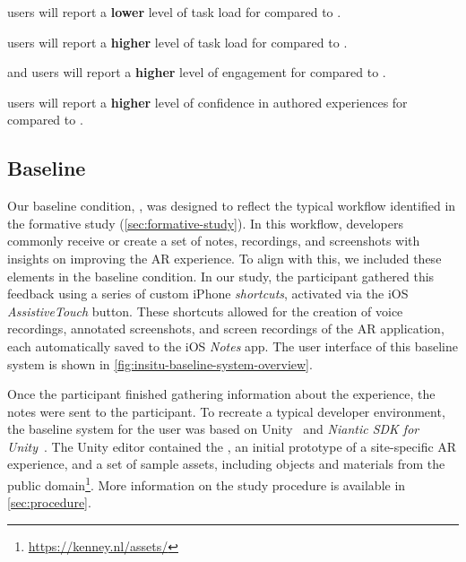 \begin{hypothesis}\label{h1}
\Exsitu users will report a \textbf{lower} level of task load for \sync{} compared to \async{}.
\end{hypothesis}

\begin{hypothesis}\label{h2}
\Insitu users will report a \textbf{higher} level of task load for \sync{} compared to \async{}.
\end{hypothesis}

\begin{hypothesis}\label{h3}
\Exsitu and \insitu users will report a \textbf{higher} level of engagement for \sync{} compared to \async{}.
\end{hypothesis}

\begin{hypothesis}\label{h4}
\Exsitu users will report a \textbf{higher} level of confidence in authored experiences for \sync{} compared to \async{}.
\end{hypothesis}

\subsection{Baseline}
Our baseline condition, \async, was designed to reflect the typical workflow identified in the formative study (\cref{sec:formative-study}). In this workflow, developers commonly receive or create a set of notes, recordings, and screenshots with insights on improving the AR experience. To align with this, we included these elements in the baseline condition. In our study, the \insitu participant gathered this feedback using a series of custom iPhone \textit{shortcuts}\cite{appleShortcutsUserGuide2024}, activated via the iOS \textit{AssistiveTouch} button. These shortcuts allowed for the creation of voice recordings, annotated screenshots, and screen recordings of the AR application, each automatically saved to the iOS \textit{Notes} app. The user interface of this baseline system is shown in \cref{fig:insitu-baseline-system-overview}.

Once the \insitu participant finished gathering information about the experience, the notes were sent to the \exsitu participant. To recreate a typical developer environment, the baseline system for the \exsitu user was based on Unity~\cite{unity} and \textit{Niantic SDK for Unity}~\cite{lightship-ardk-niantic}. The Unity editor contained the \locMesh, an initial prototype of a site-specific AR experience, and a set of sample assets, including objects and materials from the public domain\footnote{\url{https://kenney.nl/assets/}}.
More information on the study procedure is available in \cref{sec:procedure}.

